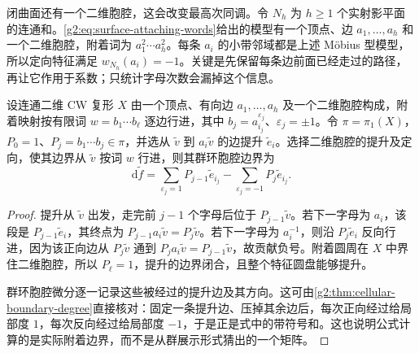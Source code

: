 \ProseParagraphBreak

闭曲面还有一个二维胞腔，这会改变最高次同调。令 \(N_h\) 为 \(h\geq1\) 个实射影平面的连通和。\eqref{g2:eq:surface-attaching-words}给出的模型有一个顶点、边 \(a_1,\ldots,a_h\) 和一个二维胞腔，附着词为 \(a_1^2\cdots a_h^2\)。每条 \(a_i\) 的小带邻域都是上述 Möbius 型模型，所以定向特征满足 \(w_{N_h}(a_i)=-1\)。关键是先保留每条边前面已经走过的路径，再让它作用于系数；只统计字母次数会漏掉这个信息。

\begin{lemma}\label{g2:lem:lifted-polygon-boundary}
	设连通二维 CW 复形 \(X\) 由一个顶点、有向边 \(a_1,\ldots,a_h\) 及一个二维胞腔构成，附着映射按有限词 \(w=b_1\cdots b_\ell\) 逐边行进，其中 \(b_j=a_{i_j}^{\varepsilon_j}\)、\(\varepsilon_j=\pm1\)。令 \(\pi=\pi_1(X)\)，\(P_0=1\)、\(P_j=b_1\cdots b_j\in\pi\)，并选从 \(\widetilde v\) 到 \(a_i\widetilde v\) 的边提升 \(\widetilde e_i\)。选择二维胞腔的提升及定向，使其边界从 \(\widetilde v\) 按词 \(w\) 行进，则其群环胞腔边界为
	\begin{equation}\label{g2:eq:lifted-word-boundary}
		\mathrm d\widetilde f
		=\sum_{\varepsilon_j=1}P_{j-1}\widetilde e_{i_j}
		-\sum_{\varepsilon_j=-1}P_j\widetilde e_{i_j}.
	\end{equation}
\end{lemma}
\begin{proof}
	提升从 \(\widetilde v\) 出发，走完前 \(j-1\) 个字母后位于 \(P_{j-1}\widetilde v\)。若下一字母为 \(a_i\)，该段是 \(P_{j-1}\widetilde e_i\)，其终点为 \(P_{j-1}a_i\widetilde v=P_j\widetilde v\)。若下一字母为 \(a_i^{-1}\)，则沿 \(P_j\widetilde e_i\) 反向行进，因为该正向边从 \(P_j\widetilde v\) 通到 \(P_ja_i\widetilde v=P_{j-1}\widetilde v\)，故贡献负号。附着圆周在 \(X\) 中界住二维胞腔，所以 \(P_\ell=1\)，提升的边界闭合，且整个特征圆盘能够提升。

	群环胞腔微分逐一记录这些被经过的提升边及其方向。这可由\cref{g2:thm:cellular-boundary-degree}直接核对：固定一条提升边、压掉其余边后，每次正向经过给局部度 \(1\)，每次反向经过给局部度 \( -1\)，于是正是式中的带符号和。这也说明公式计算的是实际附着边界，而不是从群展示形式猜出的一个矩阵。
\end{proof}


